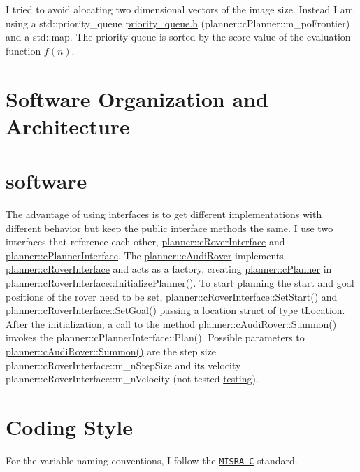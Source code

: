 I tried to avoid alocating two dimensional vectors of the image size. Instead I am using a std\+::priority\+\_\+queue \mbox{\hyperlink{priority__queue_8h_source}{priority\+\_\+queue.\+h}} (planner\+::c\+Planner\+::m\+\_\+po\+Frontier) and a std\+::map. The priority queue is sorted by the score value of the evaluation function $f(n)$.

\section*{Software Organization and Architecture}\hypertarget{index_software}{}\section{software}\label{index_software}
The advantage of using interfaces is to get different implementations with different behavior but keep the public interface methods the same. I use two interfaces that reference each other, \mbox{\hyperlink{classplanner_1_1c_rover_interface}{planner\+::c\+Rover\+Interface}} and \mbox{\hyperlink{classplanner_1_1c_planner_interface}{planner\+::c\+Planner\+Interface}}. The \mbox{\hyperlink{classplanner_1_1c_audi_rover}{planner\+::c\+Audi\+Rover}} implements \mbox{\hyperlink{classplanner_1_1c_rover_interface}{planner\+::c\+Rover\+Interface}} and acts as a factory, creating \mbox{\hyperlink{classplanner_1_1c_planner}{planner\+::c\+Planner}} in planner\+::c\+Rover\+Interface\+::\+Initialize\+Planner(). To start planning the start and goal positions of the rover need to be set, planner\+::c\+Rover\+Interface\+::\+Set\+Start() and planner\+::c\+Rover\+Interface\+::\+Set\+Goal() passing a location struct of type t\+Location. After the initialization, a call to the method \mbox{\hyperlink{classplanner_1_1c_audi_rover_a52c48afa0829f858c19d3ecf4940db21}{planner\+::c\+Audi\+Rover\+::\+Summon()}} invokes the planner\+::c\+Planner\+Interface\+::\+Plan(). Possible parameters to \mbox{\hyperlink{classplanner_1_1c_audi_rover_a52c48afa0829f858c19d3ecf4940db21}{planner\+::c\+Audi\+Rover\+::\+Summon()}} are the step size planner\+::c\+Rover\+Interface\+::m\+\_\+n\+Step\+Size and its velocity planner\+::c\+Rover\+Interface\+::m\+\_\+n\+Velocity (not tested \mbox{\hyperlink{index_testing}{testing}}).

\section*{Coding Style}

For the variable naming conventions, I follow the \href{https://en.wikipedia.org/wiki/MISRA_C}{\tt M\+I\+S\+RA C} standard.

